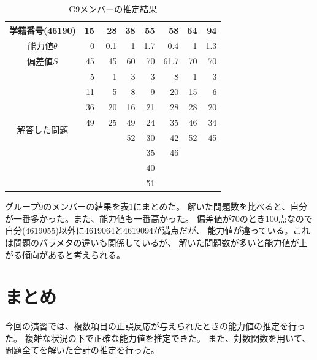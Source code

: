 \documentclass[12pt]{jarticle}
\begin{document}
\begin{table}[htb]
    \begin{center}
        \caption{G9メンバーの推定結果}
        \begin{tabular}{|c|r|r|r|r|r|r|r|}
            \hline
            学籍番号(46190)               & 15 & 28   & 38 & 55  & 58   & 64 & 94  \\
            \hline
            能力値$\theta$                & 0  & -0.1 & 1  & 1.7 & 0.4  & 1  & 1.3 \\
            \hline
            偏差値$S$                     & 45 & 45   & 60 & 70  & 61.7 & 70 & 70  \\
            \hline
            \multirow{8}{*}{解答した問題} & 5  & 1    & 3  & 3   & 8    & 1  & 3   \\
                                          & 11 & 5    & 8  & 9   & 20   & 15 & 6   \\
                                          & 36 & 20   & 16 & 21  & 28   & 28 & 20  \\
                                          & 49 & 25   & 49 & 24  & 35   & 46 & 34  \\
                                          &    &      & 52 & 30  & 42   & 52 & 45  \\
                                          &    &      &    & 35  & 46   &    &     \\
                                          &    &      &    & 40  &      &    &     \\
                                          &    &      &    & 51  &      &    &     \\
            \hline
        \end{tabular}
    \end{center}
\end{table}

グループ9のメンバーの結果を表1にまとめた。
解いた問題数を比べると、自分が一番多かった。また、能力値も一番高かった。
偏差値が70のとき100点なので自分(4619055)以外に4619064と4619094が満点だが、
能力値が違っている。これは問題のパラメタの違いも関係しているが、
解いた問題数が多いと能力値が上がる傾向があると考えられる。


\section{まとめ}
今回の演習では、複数項目の正誤反応が与えられたときの能力値の推定を行った。
複雑な状況の下で正確な能力値を推定できた。
また、対数関数を用いて、問題全てを解いた合計の推定を行った。


\clearpage
\appendix
\end{document}
